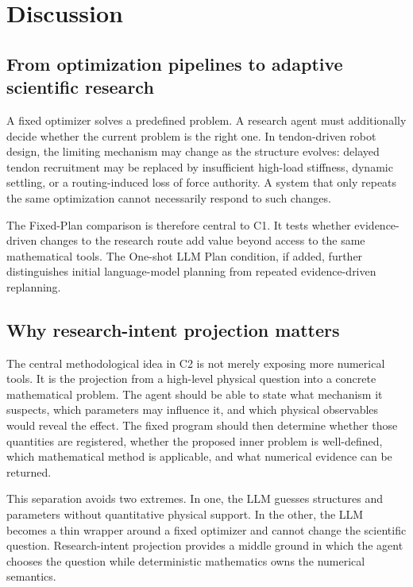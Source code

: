\section{Discussion}
\label{sec:discussion}

\subsection{From optimization pipelines to adaptive scientific research}

A fixed optimizer solves a predefined problem. A research agent must additionally decide whether the current problem is the right one. In tendon-driven robot design, the limiting mechanism may change as the structure evolves: delayed tendon recruitment may be replaced by insufficient high-load stiffness, dynamic settling, or a routing-induced loss of force authority. A system that only repeats the same optimization cannot necessarily respond to such changes.

The Fixed-Plan comparison is therefore central to C1. It tests whether evidence-driven changes to the research route add value beyond access to the same mathematical tools. The One-shot LLM Plan condition, if added, further distinguishes initial language-model planning from repeated evidence-driven replanning.

\subsection{Why research-intent projection matters}

The central methodological idea in C2 is not merely exposing more numerical tools. It is the projection from a high-level physical question into a concrete mathematical problem. The agent should be able to state what mechanism it suspects, which parameters may influence it, and which physical observables would reveal the effect. The fixed program should then determine whether those quantities are registered, whether the proposed inner problem is well-defined, which mathematical method is applicable, and what numerical evidence can be returned.

This separation avoids two extremes. In one, the LLM guesses structures and parameters without quantitative physical support. In the other, the LLM becomes a thin wrapper around a fixed optimizer and cannot change the scientific question. Research-intent projection provides a middle ground in which the agent chooses the question while deterministic mathematics owns the numerical semantics.


